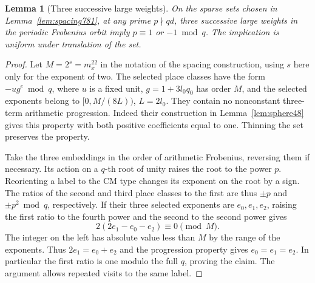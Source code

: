 \documentclass[a4paper,11pt]{article}
\newtheorem{lemma}[proposition]{Lemma}
\theoremstyle{definition}
\theoremstyle{remark}
\numberwithin{equation}{section}
\begin{document}
\begin{lemma}[Three successive large weights]
\leavevmode\label{lem:threesuccessive791}
On the sparse sets chosen in Lemma~\ref{lem:spacing781}, at any
prime \(p\nmid qd\), three successive large weights in the
periodic Frobenius orbit imply \(p\equiv 1\) or \(-1\bmod q\).
The implication is uniform under translation of the set.
\end{lemma}
\begin{proof}
Let \(M=2^s=m_x^{22}\) in the notation of the spacing
construction, using \(s\) here only for the exponent of two.
The selected place classes have the form \(-u g^e\bmod q\),
where \(u\) is a fixed unit, \(g=1+3l_0q_0\) has order
\(M\), and the selected exponents belong to
\([0,M/(8L))\), \(L=2l_0\). They contain no nonconstant
three-term arithmetic progression. Indeed their construction
in Lemma~\ref{lem:sphere48} gives this property with both
positive coefficients equal to one. Thinning the set
preserves the property.

Take the three embeddings in the order of arithmetic
Frobenius, reversing them if necessary. Its action on a
\(q\)-th root of unity raises the root to the power \(p\).
Reorienting a label to the CM type changes its exponent on
the root by a sign. The ratios of the second and third
place classes to the first are thus \(\pm p\) and
\(\pm p^2\bmod q\), respectively. If their three selected
exponents are \(e_0,e_1,e_2\), raising the first ratio to
the fourth power and the second to the second power gives
\[
                2(2e_1-e_0-e_2)\equiv0\pmod M .
\]
The integer on the left has absolute value less than \(M\)
by the range of the exponents. Thus \(2e_1=e_0+e_2\) and
the progression property gives \(e_0=e_1=e_2\). In particular
the first ratio is one modulo the full \(q\), proving the
claim. The argument allows repeated visits to the same label.
\end{proof}
\end{document}
